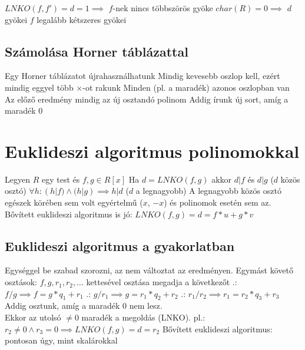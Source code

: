 \documentclass[12pt,a4paper]{article}
\begin{document}
\begin{outline}
	\1 $LNKO(f,f')=d=1 \implies$ $f$-nek nincs többszörös gyöke
	\1 $char(R)=0 \implies$ $d$ gyökei $f$ legalább kétszeres gyökei
\end{outline}

\subsection{Számolása Horner táblázattal}

\begin{outline}
	\1 Egy Horner táblázatot újrahasználhatunk
		\2 Mindig kevesebb oszlop kell, ezért mindig eggyel több $\times$-ot rakunk
		\2 Minden (pl. a maradék) azonos oszlopban van
	\1 Az előző eredmény mindig az új osztandó polinom
	\1 Addig írunk új sort, amíg a maradék $0$
\end{outline}

\pagebreak

\section{Euklideszi algoritmus polinomokkal}

\begin{outline}
	\1 Legyen $R$ egy test és $f,g \in R[x]$
	\1 Ha $d=LNKO(f,g)$ akkor
		\2 $d|f$ és $d|g$ \;\; ($d$ közös osztó)
		\2 $\forall h: (h|f) \wedge (h|g) \implies h|d$ \;\; ($d$ a legnagyobb)
	\1 A legnagyobb közös osztó egészek körében sem volt egyértelmű ($x$, $-x$)
	és polinomok esetén sem az.
	\1 Bővített euklideszi algoritmus is jó: $LNKO(f,g)=d=f*u+g*v$
\end{outline}

\subsection{Euklideszi algoritmus a gyakorlatban}

\begin{outline}
	\1 Egységgel be szabad szorozni, az nem változtat az eredményen.
	\1 Egymást követő osztások:
		\2 $f,g,r_1,r_2,...$ kettesével osztása megadja a következőt
		.: $f/g \implies f=g*q_1+r_1$
		.: $g/r_1 \implies g=r_1*q_2+r_2$
		.: $r_1/r_2 \implies r_1=r_2*q_3+r_3$
	\1 Addig osztunk, amíg a maradék 0 nem lesz.\\
	Ekkor az utolsó $\ne 0$ maradék a megoldás (LNKO).
		\2 pl.: $r_2 \ne 0 \wedge r_3 = 0 \implies LNKO(f,g)=d=r_2$
	\1 Bővített euklideszi algoritmus: pontosan úgy, mint skalárokkal
\end{outline}
\end{document}
